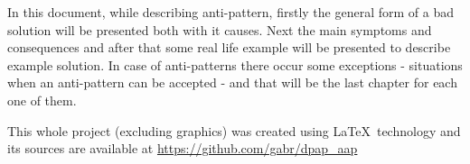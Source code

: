 In this document, while describing anti-pattern, firstly the general form of a bad solution will be presented both with it causes. Next the main symptoms and consequences and after that some real life example will be presented to describe example solution.
In case of anti-patterns there occur some exceptions - situations when an anti-pattern can be accepted - and that will be the last chapter for each one of them.

\begin{bottompar}
This whole project (excluding graphics) was created using \LaTeX \ technology and its sources are available at \url{https://github.com/gabr/dpap_aap}

\ 
\end{bottompar}